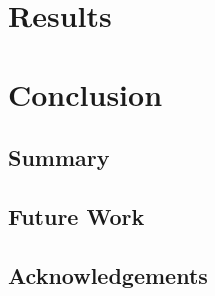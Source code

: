 \documentclass[a4paper]{report}
\begin{document}
\chapter{Results}

\chapter{Conclusion}
\section{Summary}

\section{Future Work}

\section{Acknowledgements}





\begin{appendices}

% 
    
\end{appendices}
\end{document}
